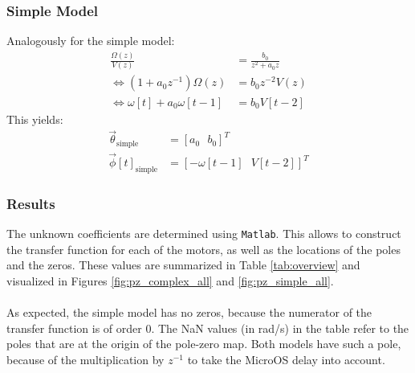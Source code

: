 \documentclass[a4paper,kul]{kulakarticle} %
\begin{document}
\subsubsection*{Simple Model}
Analogously for the simple model:
\begin{equation}
\begin{split}
\frac{\Omega(z)}{V(z)} &= \frac{b_0}{z^2 + a_0 z} \\
\iff (1 + a_0 z^{-1})\Omega(z) &= b_0 z^{-2} V(z) \\	
\iff \omega[t] + a_0 \omega[t-1] &= b_0 V[t-2]
\end{split}
\end{equation}
This yields: 
\begin{equation}
\begin{split}
\vec{\theta}_{\text{simple}} &= \left[a_0\text{ }b_0\right]^T \\
\vec{\phi}[t]_{\text{simple}} &= \left[-\omega[t-1]\text{ }V[t-2]\right]^T
\end{split}
\end{equation}

\subsubsection{Results}
\noindent The unknown coefficients are determined using \texttt{Matlab}. This allows to construct the transfer function for each of the motors, as well as the locations of the poles and the zeros. These values are summarized in Table \ref{tab:overview} and visualized in Figures \ref{fig:pz_complex_all} and \ref{fig:pz_simple_all}.
\\\\
As expected, the simple model has no zeros, because the numerator of the transfer function is of order 0. The NaN values (in rad/s) in the table refer to the poles that are at the origin of the pole-zero map. Both models have such a pole, because of the multiplication by $z^{-1}$ to take the MicroOS delay into account. 




\end{document}
